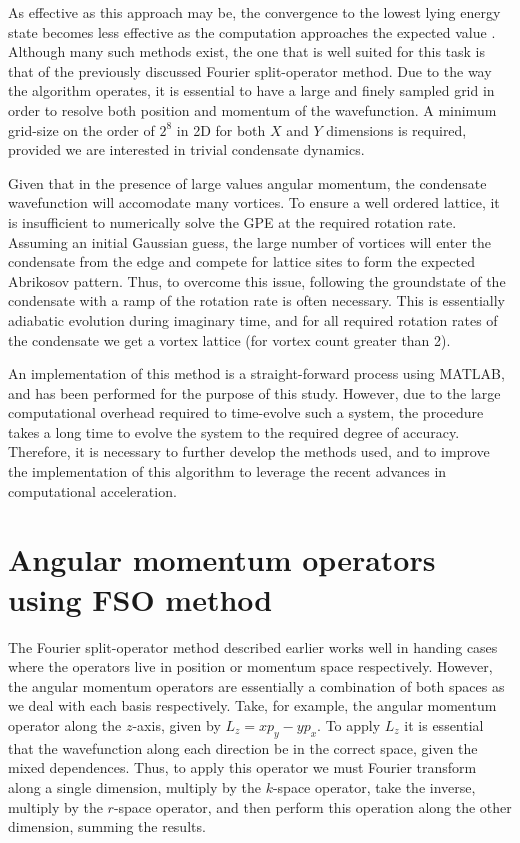 As effective as this approach may be, the convergence to the lowest lying energy state becomes less effective as the computation approaches the expected value \cite{Vtx:Danaila_pra_2005}. Although many such methods exist, the one that is well suited for this task is that of the previously discussed Fourier split-operator method. Due to the way the algorithm operates, it is essential to have a large and finely sampled grid in order to resolve both position and momentum of the wavefunction. A minimum grid-size on the order of $2^8$ in 2D for both $X$ and $Y$ dimensions is required, provided we are interested in trivial condensate dynamics.

Given that in the presence of large values angular momentum, the condensate wavefunction will accomodate many vortices. To ensure a well ordered lattice, it is insufficient to numerically solve the GPE at the required rotation rate. Assuming an initial Gaussian guess, the large number of vortices will enter the condensate from the edge and compete for lattice sites to form the expected Abrikosov pattern. Thus, to overcome this issue, following the groundstate of the condensate with a ramp of the rotation rate is often necessary. This is essentially adiabatic evolution during imaginary time, and for all required rotation rates of the condensate we get a vortex lattice (for vortex count greater than 2).

An implementation of this method is a straight-forward process using MATLAB, and has been performed for the purpose of this study. However, due to the large computational overhead required to time-evolve such a system, the procedure takes a long time to evolve the system to the required degree of accuracy. Therefore, it is necessary to further develop the methods used, and to improve the implementation of this algorithm to leverage the recent advances in computational acceleration.

\section{Angular momentum operators using FSO method}
The Fourier split-operator method described earlier works well in handing cases where the operators live in position or momentum space respectively. However, the angular momentum operators are essentially a combination of both spaces as we deal with each basis respectively. Take, for example, the angular momentum operator along the $z$-axis, given by $L_z = xp_y - yp_x$. To apply $L_z$ it is essential that the wavefunction along each direction be in the correct space, given the mixed dependences. Thus, to apply this operator we must Fourier transform along a single dimension, multiply by the $k$-space operator, take the inverse, multiply by the $r$-space operator, and then perform this operation along the other dimension, summing the results.

